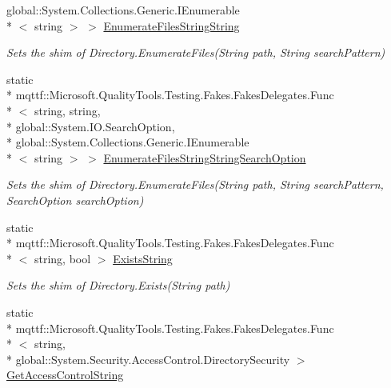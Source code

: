 \begin{DoxyCompactItemize}
global\-::\-System.\-Collections.\-Generic.\-I\-Enumerable\\*
$<$ string $>$ $>$ \hyperlink{class_system_1_1_i_o_1_1_fakes_1_1_shim_directory_a8bc129632c38507d9de4dc683b9f7089}{Enumerate\-Files\-String\-String}
\begin{DoxyCompactList}\small\item\em Sets the shim of Directory.\-Enumerate\-Files(\-String path, String search\-Pattern)\end{DoxyCompactList}\item 
static \\*
mqttf\-::\-Microsoft.\-Quality\-Tools.\-Testing.\-Fakes.\-Fakes\-Delegates.\-Func\\*
$<$ string, string, \\*
global\-::\-System.\-I\-O.\-Search\-Option, \\*
global\-::\-System.\-Collections.\-Generic.\-I\-Enumerable\\*
$<$ string $>$ $>$ \hyperlink{class_system_1_1_i_o_1_1_fakes_1_1_shim_directory_a0a77509033e94d408a48e27e4a9fbf5d}{Enumerate\-Files\-String\-String\-Search\-Option}
\begin{DoxyCompactList}\small\item\em Sets the shim of Directory.\-Enumerate\-Files(\-String path, String search\-Pattern, Search\-Option search\-Option)\end{DoxyCompactList}\item 
static \\*
mqttf\-::\-Microsoft.\-Quality\-Tools.\-Testing.\-Fakes.\-Fakes\-Delegates.\-Func\\*
$<$ string, bool $>$ \hyperlink{class_system_1_1_i_o_1_1_fakes_1_1_shim_directory_a829ac6939e42928369dde3a1c6a498fa}{Exists\-String}
\begin{DoxyCompactList}\small\item\em Sets the shim of Directory.\-Exists(\-String path)\end{DoxyCompactList}\item 
static \\*
mqttf\-::\-Microsoft.\-Quality\-Tools.\-Testing.\-Fakes.\-Fakes\-Delegates.\-Func\\*
$<$ string, \\*
global\-::\-System.\-Security.\-Access\-Control.\-Directory\-Security $>$ \hyperlink{class_system_1_1_i_o_1_1_fakes_1_1_shim_directory_a15cca0eef43209b7d650e10da340086c}{Get\-Access\-Control\-String}

\end{DoxyCompactItemize}
